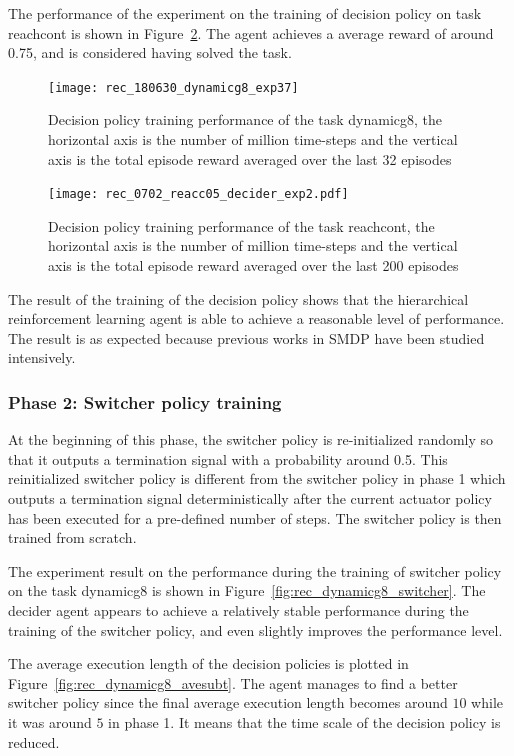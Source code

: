 The performance of the experiment on the training of decision policy on task reachcont is shown in Figure~\ref{fig:rec_reachc05_decider_subt10}. The agent achieves a average reward of around 0.75, and is considered having solved the task.


\begin{figure}[!htbp]
\centering
\texttt{[image: rec\_180630\_dynamicg8\_exp37]}
\caption{Decision policy training performance of the task dynamicg8, the horizontal axis is the number of million time-steps and the vertical axis is the total episode reward averaged over the last 32 episodes}
\label{fig:rec_dynamicg8_decider_subt10}
\end{figure}


\begin{figure}
\centering
\texttt{[image: rec\_0702\_reacc05\_decider\_exp2.pdf]}
\caption{Decision policy training performance of the task reachcont, the horizontal axis is the number of million time-steps and the vertical axis is the total episode reward averaged over the last 200 episodes}
\label{fig:rec_reachc05_decider_subt10}
\end{figure}

The result of the training of the decision policy shows that the hierarchical reinforcement learning agent is able to achieve a reasonable level of performance. The result is as expected because previous works in SMDP have been studied intensively.

\subsubsection{Phase 2: Switcher policy training}
At the beginning of this phase, the switcher policy is re-initialized randomly so that it outputs a termination signal with a probability around 0.5. This reinitialized switcher policy is different from the switcher policy in phase 1 which outputs a termination signal deterministically after the current actuator policy has been executed for a pre-defined number of steps. The switcher policy is then trained from scratch.

The experiment result on the performance during the training of switcher policy on the task dynamicg8 is shown in Figure~\ref{fig:rec_dynamicg8_switcher}. The decider agent appears to achieve a relatively stable performance during the training of the switcher policy, and even slightly improves the performance level.

The average execution length of the decision policies is plotted in Figure~\ref{fig:rec_dynamicg8_avesubt}. The agent manages to find a better switcher policy since the final average execution length becomes around $10$ while it was around $5$ in phase 1. It means that the time scale of the decision policy is reduced.

